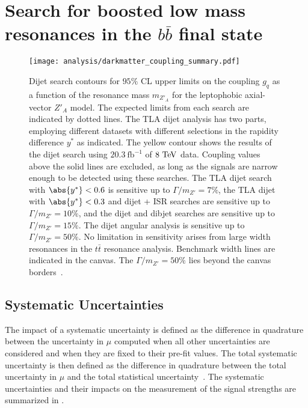 \chapter{Search for boosted low mass resonances in the $b\bar{b}$ final state}\label{chapter:analysis}

\begin{figure}[htbp]
 \centering
 \texttt{[image: analysis/darkmatter\_coupling\_summary.pdf]}
 \caption[Dijet search contours for $95\%$ CL upper limits on the coupling $g_{q}$ for the leptophobic axial-vector $Z'_{A}$ model.]{%
 Dijet search contours for $95\%$ CL upper limits on the coupling $g_{q}$ as a function of the resonance mass $m_{Z'_{A}}$ for the leptophobic axial-vector $Z'_{A}$ model.
 The expected limits from each search are indicated by dotted lines.
 The TLA dijet analysis has two parts, employing different datasets with different selections in the rapidity difference $y^{*}$ as indicated.
 The yellow contour shows the results of the dijet search using $20.3~\mathrm{fb}^{-1}$ of $8~\mathrm{TeV}$ data.
 Coupling values above the solid lines are excluded, as long as the signals are narrow enough to be detected using these searches.
 The TLA dijet search with $\abs{y^{*}} < 0.6$ is sensitive up to $\Gamma/m_{Z'} = 7\%$, the TLA dijet with $\abs{y^{*}} < 0.3$ and dijet + ISR searches are sensitive up to $\Gamma/m_{Z'} = 10\%$, and the dijet and dibjet searches are sensitive up to $\Gamma/m_{Z'} = 15\%$.
 The dijet angular analysis is sensitive up to $\Gamma/m_{Z'} = 50\%$.
 No limitation in sensitivity arises from large width resonances in the $t\bar{t}$ resonance analysis.
 Benchmark width lines are indicated in the canvas.
 The $\Gamma/m_{Z'} = 50\%$ lies beyond the canvas borders~\cite{Zprime_gq_limit_public_plot}.}
 \label{fig:darkmatter_coupling_summary}
\end{figure}

\section{Systematic Uncertainties}\label{sec:systematic_uncertainties}

The impact of a systematic uncertainty is defined as the difference in quadrature between the uncertainty in $\mu$ computed when all other uncertainties are considered and when they are fixed to their pre-fit values.
The total systematic uncertainty is then defined as the difference in quadrature between the total uncertainty in $\mu$ and the total statistical uncertainty~\cite{ATLAS-CONF-2018-052}.
The systematic uncertainties and their impacts on the measurement of the signal strengths are summarized in .

